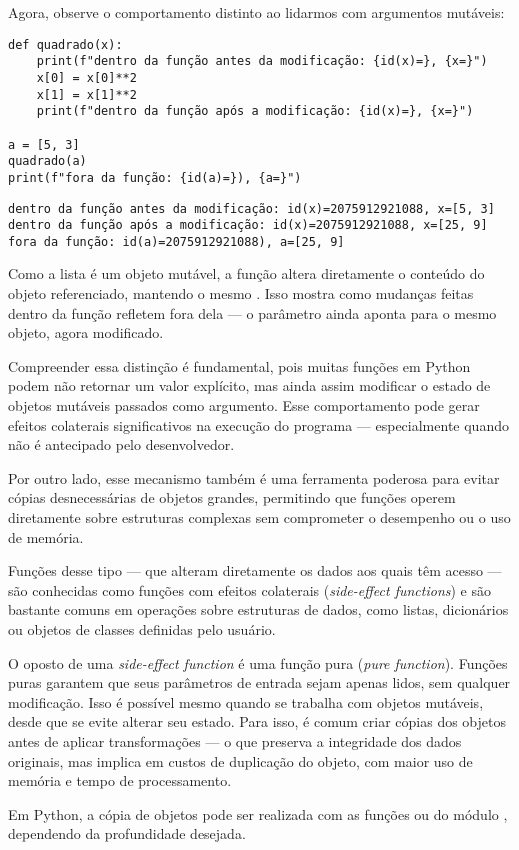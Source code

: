 Agora, observe o comportamento distinto ao lidarmos com argumentos mutáveis:
\begin{verbatim}
def quadrado(x):
    print(f"dentro da função antes da modificação: {id(x)=}, {x=}")
    x[0] = x[0]**2
    x[1] = x[1]**2
    print(f"dentro da função após a modificação: {id(x)=}, {x=}")

a = [5, 3]
quadrado(a)
print(f"fora da função: {id(a)=}), {a=}")
\end{verbatim}
\begin{verbatim}
dentro da função antes da modificação: id(x)=2075912921088, x=[5, 3]
dentro da função após a modificação: id(x)=2075912921088, x=[25, 9]
fora da função: id(a)=2075912921088), a=[25, 9]
\end{verbatim}

Como a lista é um objeto mutável, a função altera diretamente o conteúdo do objeto referenciado,
mantendo o mesmo .
Isso mostra como mudanças feitas dentro da função refletem fora dela --- o parâmetro ainda aponta para o mesmo objeto,
agora modificado.


Compreender essa distinção é fundamental, pois muitas funções em Python podem não retornar um valor explícito, mas
ainda assim modificar o estado de objetos mutáveis passados como argumento.
Esse comportamento pode gerar efeitos colaterais significativos na execução do programa --- especialmente quando
não é antecipado pelo desenvolvedor.


Por outro lado, esse mecanismo também é uma ferramenta poderosa para evitar cópias desnecessárias de objetos grandes,
permitindo que funções operem diretamente sobre estruturas complexas sem comprometer o desempenho ou o uso de memória.


Funções desse tipo --- que alteram diretamente os dados aos quais têm acesso --- são conhecidas como funções com
efeitos colaterais (\emph{side-effect functions}) e são bastante comuns em operações sobre estruturas de dados,
como listas, dicionários ou objetos de classes definidas pelo usuário.

O oposto de uma \emph{side-effect function} é uma função pura (\emph{pure function}).
Funções puras garantem que seus parâmetros de entrada sejam apenas lidos, sem qualquer modificação.
Isso é possível mesmo quando se trabalha com objetos mutáveis, desde que se evite alterar seu estado.
Para isso, é comum criar cópias dos objetos antes de aplicar transformações --- o que preserva a integridade dos
dados originais, mas implica em custos de duplicação do objeto, com maior uso de memória e tempo de processamento.

Em Python, a cópia de objetos pode ser realizada com as funções  ou  do módulo
, dependendo da profundidade desejada.



































